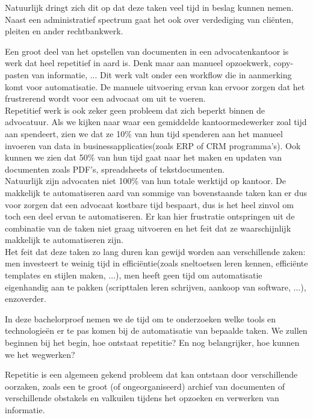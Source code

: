 Natuurlijk dringt zich dit op dat deze taken veel tijd in beslag kunnen nemen. Naast een administratief spectrum gaat het ook over verdediging van cliënten, pleiten en ander rechtbankwerk.

Een groot deel van het opstellen van documenten in een advocatenkantoor is werk dat heel repetitief in aard is.
Denk maar aan manueel opzoekwerk, copy-pasten van informatie, ...
Dit werk valt onder een workflow die in aanmerking komt voor automatisatie.
De manuele uitvoering ervan kan ervoor zorgen dat het frustrerend wordt voor een advocaat om uit te voeren. \\

Repetitief werk is ook zeker geen probleem dat zich beperkt binnen de advocatuur.
Als we kijken naar waar een gemiddelde kantoormedewerker zoal tijd aan spendeert, zien we dat ze 10\% van hun tijd spenderen aan het manueel invoeren van data in businessapplicaties(zoals \Gls{ERP} of \Gls{CRM} programma's).
Ook kunnen we zien dat 50\% van hun tijd gaat naar het maken en updaten van documenten zoals PDF's, spreadsheets of tekstdocumenten. \autocite{Workfellow} \\

Natuurlijk zijn advocaten niet 100\% van hun totale werktijd op kantoor.
De makkelijk te automatiseren aard van sommige van bovenstaande taken kan er dus voor zorgen dat een advocaat kostbare tijd bespaart, dus is het heel zinvol om toch een deel ervan te automatiseren.
Er kan hier frustratie ontspringen uit de combinatie van de taken niet graag uitvoeren en het feit dat ze waarschijnlijk makkelijk te automatiseren zijn. \\

Het feit dat deze taken zo lang duren kan gewijd worden aan verschillende zaken: men investeert te weinig tijd in efficiëntie(zoals sneltoetsen leren kennen, efficiënte templates en stijlen maken, ...),
men heeft geen tijd om automatisatie eigenhandig aan te pakken (scripttalen leren schrijven, aankoop van software, ...), enzoverder.

In deze bachelorproef nemen we de tijd om te onderzoeken welke tools en technologieën er te pas komen bij de automatisatie van bepaalde taken.
We zullen beginnen bij het begin, hoe ontstaat repetitie? En nog belangrijker, hoe kunnen we het wegwerken?

Repetitie is een algemeen gekend probleem dat kan ontstaan door verschillende oorzaken,
zoals een te groot (of ongeorganiseerd) archief van documenten of verschillende obstakels en valkuilen tijdens het opzoeken en verwerken van informatie.


